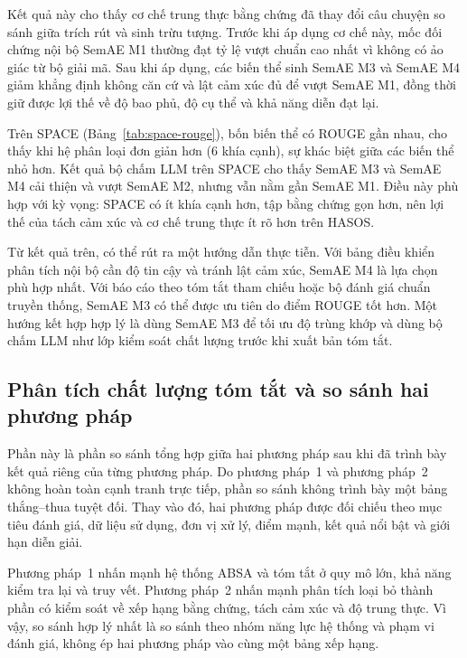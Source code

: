 Kết quả này cho thấy cơ chế trung thực bằng chứng đã thay đổi câu chuyện so sánh giữa trích rút và sinh trừu tượng. Trước khi áp dụng cơ chế này, mốc đối chứng nội bộ SemAE M1 thường đạt tỷ lệ vượt chuẩn cao nhất vì không có ảo giác từ bộ giải mã. Sau khi áp dụng, các biến thể sinh SemAE M3 và SemAE M4 giảm khẳng định không căn cứ và lật cảm xúc đủ để vượt SemAE M1, đồng thời giữ được lợi thế về độ bao phủ, độ cụ thể và khả năng diễn đạt lại.

Trên SPACE (Bảng~\ref{tab:space-rouge}), bốn biến thể có ROUGE gần nhau, cho thấy khi hệ phân loại đơn giản hơn (6 khía cạnh), sự khác biệt giữa các biến thể nhỏ hơn. Kết quả bộ chấm LLM trên SPACE cho thấy SemAE M3 và SemAE M4 cải thiện và vượt SemAE M2, nhưng vẫn nằm gần SemAE M1. Điều này phù hợp với kỳ vọng: SPACE có ít khía cạnh hơn, tập bằng chứng gọn hơn, nên lợi thế của tách cảm xúc và cơ chế trung thực ít rõ hơn trên HASOS.

Từ kết quả trên, có thể rút ra một hướng dẫn thực tiễn. Với bảng điều khiển phân tích nội bộ cần độ tin cậy và tránh lật cảm xúc, SemAE M4 là lựa chọn phù hợp nhất. Với báo cáo theo tóm tắt tham chiếu hoặc bộ đánh giá chuẩn truyền thống, SemAE M3 có thể được ưu tiên do điểm ROUGE tốt hơn. Một hướng kết hợp hợp lý là dùng SemAE M3 để tối ưu độ trùng khớp và dùng bộ chấm LLM như lớp kiểm soát chất lượng trước khi xuất bản tóm tắt.
\subsection{Phân tích chất lượng tóm tắt và so sánh hai phương pháp}


Phần này là phần so sánh tổng hợp giữa hai phương pháp sau khi đã trình bày
kết quả riêng của từng phương pháp. Do phương pháp~1 và phương pháp~2 không
hoàn toàn cạnh tranh trực tiếp, phần so sánh không trình bày một bảng
thắng--thua tuyệt đối. Thay vào đó, hai phương pháp được đối chiếu theo mục
tiêu đánh giá, dữ liệu sử dụng, đơn vị xử lý, điểm mạnh, kết quả nổi bật và
giới hạn diễn giải.

Phương pháp~1 nhấn mạnh hệ thống ABSA và tóm tắt ở quy mô lớn, khả năng
kiểm tra lại và truy vết. Phương pháp~2 nhấn mạnh phân tích loại bỏ thành phần có kiểm soát về
xếp hạng bằng chứng, tách cảm xúc và độ trung thực. Vì vậy, so sánh hợp lý nhất là
so sánh theo nhóm năng lực hệ thống và phạm vi đánh giá, không ép hai phương
pháp vào cùng một bảng xếp hạng.


